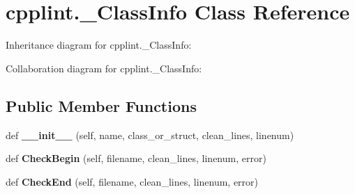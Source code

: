 \hypertarget{classcpplint_1_1__ClassInfo}{}\section{cpplint.\+\_\+\+Class\+Info Class Reference}
\label{classcpplint_1_1__ClassInfo}


Inheritance diagram for cpplint.\+\_\+\+Class\+Info\+:


Collaboration diagram for cpplint.\+\_\+\+Class\+Info\+:
\subsection*{Public Member Functions}
\begin{DoxyCompactItemize}
\item 
\mbox{\label{classcpplint_1_1__ClassInfo_a549b13e77acbe712f79a2d2b2c98ff7d}} 
def {\bfseries \+\_\+\+\_\+init\+\_\+\+\_\+} (self, name, class\+\_\+or\+\_\+struct, clean\+\_\+lines, linenum)
\item 
\mbox{\label{classcpplint_1_1__ClassInfo_abed47237f2e7416ca51cb220cfad6c1b}} 
def {\bfseries Check\+Begin} (self, filename, clean\+\_\+lines, linenum, error)
\item 
\mbox{\label{classcpplint_1_1__ClassInfo_a8a61461a72928bc6ce62a9b75b770fec}} 
def {\bfseries Check\+End} (self, filename, clean\+\_\+lines, linenum, error)
\end{DoxyCompactItemize}
